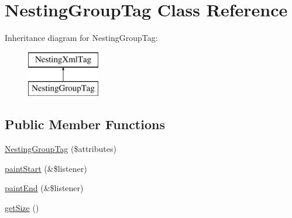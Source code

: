 \hypertarget{class_nesting_group_tag}{
\section{NestingGroupTag Class Reference}
\label{class_nesting_group_tag}
}
Inheritance diagram for NestingGroupTag:\begin{figure}[H]
\begin{center}
\leavevmode
\includegraphics[height=2.000000cm]{class_nesting_group_tag}
\end{center}
\end{figure}
\subsection*{Public Member Functions}
\begin{DoxyCompactItemize}
\item 
\hyperlink{class_nesting_group_tag_aa5a5531ce68090e860bb469eb65a246b}{NestingGroupTag} (\$attributes)
\item 
\hyperlink{class_nesting_group_tag_af2f93c4f4e8003733dee086baf9179c4}{paintStart} (\&\$listener)
\item 
\hyperlink{class_nesting_group_tag_a0800987bc9577f2460a502dc0becd692}{paintEnd} (\&\$listener)
\item 
\hyperlink{class_nesting_group_tag_a513da334c0a3d682b0c773f9e69ae74a}{getSize} ()
\end{DoxyCompactItemize}


